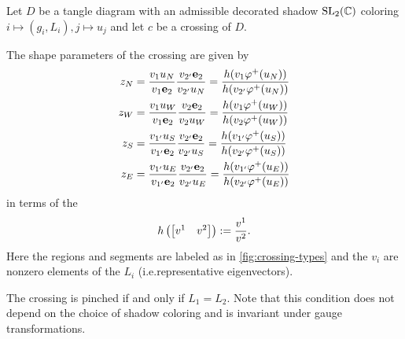 \documentclass[leqno]{sl2art}
\begin{document}
\begin{theorem}
  \label{thm:shape-formula}
  Let \(D\) be a tangle diagram with an admissible decorated shadow \(\operatorname{SL}_2(\mathbb{C})\) coloring \(i \mapsto (g_i, L_i), j \mapsto u_j\) and let \(c\) be a crossing of \(D\).
  \begin{thmenum}
    \item
    \label{thm:shape-formula:formula}
      The shape parameters of the crossing  are given by
      \begin{align}
        \label{eq:zN-formula}
        z_N
      &=
      \frac{
        v_1 u_N
        }{
        v_1 \mathrm{\mathbf{e}}_{2}
      }
      \frac{
        v_{2'} \mathrm{\mathbf{e}}_{2}
        }{
        v_{2'} u_N
      }
      =
      \frac{
        h(v_{1} \varphi^+\mathopen{}\left(u_N\right))
        }{
        h(v_{2'} \varphi^+\mathopen{}\left(u_N\right))
      }
      \\
      \label{eq:zW-formula}
      z_W
      &=
      \frac{
        v_{1} u_W
        }{
        v_{1} \mathrm{\mathbf{e}}_{2}
      }
      \frac{
        v_{2} \mathrm{\mathbf{e}}_{2}
        }{
        v_{2} u_W
      }
      =
      \frac{
        h(v_{1} \varphi^+\mathopen{}\left(u_W\right))
        }{
        h(v_{2} \varphi^+\mathopen{}\left(u_W\right))
      }
      \\
      \label{eq:zS-formula}
      z_S
      &=
      \frac{
        v_{1'} u_S
        }{
        v_{1'} \mathrm{\mathbf{e}}_{2}
      }
      \frac{
        v_{2'} \mathrm{\mathbf{e}}_{2}
        }{
        v_{2'} u_S
      }
      =
      \frac{
        h(v_{1'} \varphi^+\mathopen{}\left(u_S\right))
        }{
        h(v_{2'} \varphi^+\mathopen{}\left(u_S\right))
      }
      \\
      \label{eq:zE-formula}
      z_E
      &=
      \frac{
        v_{1'} u_E
        }{
        v_{1'} \mathrm{\mathbf{e}}_{2}
      }
      \frac{
        v_{2'} \mathrm{\mathbf{e}}_{2}
        }{
        v_{2'} u_E
      }
      =
      \frac{
        h(v_{1'} \varphi^+\mathopen{}\left(u_E\right))
        }{
        h(v_{2'} \varphi^+\mathopen{}\left(u_E\right))
      }
    \end{align}
    in terms of the 
    \[
      h\left(
        \begin{bmatrix}
          v^1 & v^2
        \end{bmatrix}
      \right)
      \mathrel{:=} \frac{v^1}{v^2}.
    \]
    Here the regions and segments are labeled as in \cref{fig:crossing-types} and the \(v_i\) are nonzero elements of the \(L_i\) (i.e.\@ representative eigenvectors).
  \item
    \label{thm:shape-formula:pinched}
    The crossing is pinched if and only if \(L_1 = L_2\).
    Note that this condition does not depend on the choice of shadow coloring and is invariant under gauge transformations.
      \qedhere
\end{thmenum}
\end{theorem}
\end{document}
